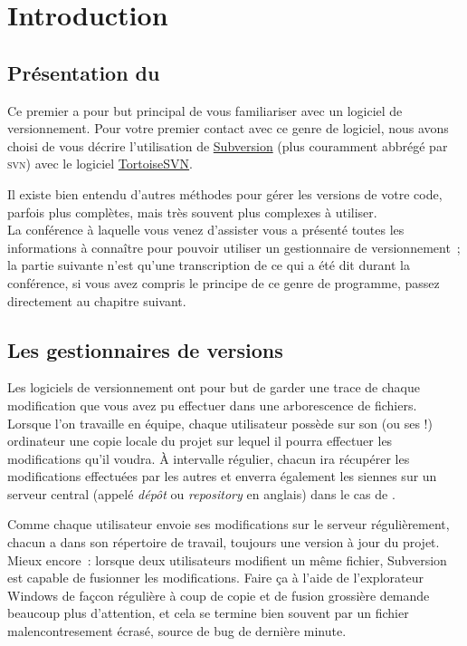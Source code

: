 \chapter{Introduction}

\section{Présentation du \tp}

Ce premier \tp{} a pour but principal de vous familiariser avec un logiciel de versionnement. Pour votre premier contact avec ce genre de logiciel, nous avons choisi de vous décrire l'utilisation de \href{http://subversion.tigris.org/}{Subversion} (plus couramment abbrégé par \textsc{svn}) avec le logiciel \href{http://tortoisesvn.tigris.org/}{TortoiseSVN}.

Il existe bien entendu d'autres méthodes pour gérer les versions de votre code, parfois plus complètes, mais très souvent plus complexes à utiliser.\\

La conférence à laquelle vous venez d'assister vous a présenté toutes les informations à connaître pour pouvoir utiliser un gestionnaire de versionnement~; la partie suivante n'est qu'une transcription de ce qui a été dit durant la conférence, si vous avez compris le principe de ce genre de programme, passez directement au chapitre suivant.


\section{Les gestionnaires de versions}

Les logiciels de versionnement ont pour but de garder une trace de chaque modification que vous avez pu effectuer dans une arborescence de fichiers. Lorsque l'on travaille en équipe, chaque utilisateur possède sur son (ou ses !) ordinateur une copie locale du projet sur lequel il pourra effectuer les modifications qu'il voudra. À intervalle régulier, chacun ira récupérer les modifications effectuées par les autres et enverra également les siennes sur un serveur central (appelé \emph{dépôt} ou \emph{repository} en anglais) dans le cas de \svn.

Comme chaque utilisateur envoie ses modifications sur le serveur régulièrement, chacun a dans son répertoire de travail, toujours une version à jour du projet.\\

Mieux encore~: lorsque deux utilisateurs modifient un même fichier, Subversion est capable de fusionner les modifications. Faire ça à l'aide de l'explorateur Windows de façcon régulière à coup de copie et de fusion grossière demande beaucoup plus d'attention, et cela se termine bien souvent par un fichier malencontresement écrasé, source de bug de dernière minute.